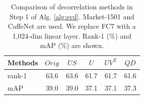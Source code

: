 \documentclass[10pt,twocolumn,letterpaper]{article}
\begin{document}
\begin{table}[!t]
\setlength{\tabcolsep}{5.9pt}
\renewcommand\arraystretch{1.1}
\begin{center}
\begin{tabular}{|l|c|c|c|c|c|}
\hline
Methods & $Orig$ & $US$ & $U$ & $UV^\mathrm{T}$ & $QD$ \\
\hline
rank-1 &63.6&63.6&61.7&61.7&61.6\\
\hline
mAP &39.0&39.0&37.1&37.1&37.3\\
\hline
\end{tabular}
\end{center}
\setlength{\abovecaptionskip}{-0cm} 
\caption{Comparison of decorrelation methods in Step 1 of Alg. \ref{alg:svd}. Market-1501 and CaffeNet are used. We replace FC7 with a 1,024-dim linear layer. Rank-1 (\%) and mAP (\%) are shown.}
\label{table:USQR}
\end{table}

\end{document}
